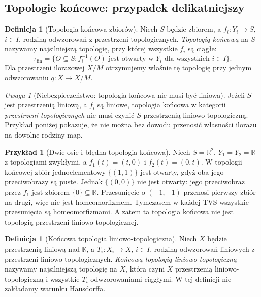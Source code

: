 \documentclass[11pt,a4paper]{article}
\numberwithin{equation}{section}
\theoremstyle{plain}
\theoremstyle{definition}
\newtheorem{definicja}[twierdzenie]{Definicja}
\newtheorem{przyklad}[twierdzenie]{Przykład}
\theoremstyle{remark}
\newtheorem{uwaga}[twierdzenie]{Uwaga}
\newcommand{\R}{\mathbb R}
\newcommand{\K}{\mathbb K}
\begin{document}
\subsection{Topologie końcowe: przypadek delikatniejszy}

\begin{definicja}[Topologia końcowa zbiorów]
Niech $S$ będzie zbiorem, a $f_i:Y_i\to S$, $i\in I$,
rodziną odwzorowań z przestrzeni topologicznych.
\emph{Topologią końcową} na $S$ nazywamy najsilniejszą
topologię, przy której wszystkie $f_i$ są ciągłe:
\[
 \tau_{\mathrm{fin}}=\{O\subseteq S:
    f_i^{-1}(O)\text{ jest otwarty w }Y_i
    \text{ dla wszystkich }i\in I\}.
\]
Dla przestrzeni ilorazowej $X/M$ otrzymujemy właśnie
tę topologię przy jednym odwzorowaniu $q:X\to X/M$.
\end{definicja}

\begin{uwaga}[Niebezpieczeństwo: topologia końcowa nie musi być liniowa]
Jeżeli $S$ jest przestrzenią liniową, a $f_i$ są liniowe,
topologia końcowa w kategorii \emph{przestrzeni topologicznych}
nie musi czynić $S$ przestrzenią liniowo-topologiczną.
Przykład poniżej pokazuje, że nie można bez dowodu
przenosić własności ilorazu na dowolne rodziny map.
\end{uwaga}

\begin{przyklad}[Dwie osie i błędna topologia końcowa]\label{ex:final-cross}
Niech $S=\R^2$, $Y_1=Y_2=\R$ z topologiami zwykłymi,
a $f_1(t)=(t,0)$ i $f_2(t)=(0,t)$. W topologii końcowej
zbiór jednoelementowy $\{(1,1)\}$ jest otwarty,
gdyż oba jego przeciwobrazy są puste. Jednak $\{(0,0)\}$
nie jest otwarty: jego przeciwobraz przez $f_1$ jest
zbiorem $\{0\}\subseteq\R$. Przesunięcie o $(-1,-1)$
przenosi pierwszy zbiór na drugi, więc nie jest
homeomorfizmem. Tymczasem w każdej TVS wszystkie
przesunięcia są homeomorfizmami. A zatem ta topologia
końcowa nie jest topologią przestrzeni liniowo-topologicznej.
\end{przyklad}

\begin{definicja}[Końcowa topologia liniowo-topologiczna]
Niech $X$ będzie przestrzenią liniową nad $\K$, a
$T_i:X_i\to X$, $i\in I$, rodziną odwzorowań
liniowych z przestrzeni liniowo-topologicznych.
\emph{Końcową topologią liniowo-topologiczną}
nazywamy najsilniejszą topologię na $X$, która czyni $X$
przestrzenią liniowo-topologiczną i wszystkie $T_i$
odwzorowaniami ciągłymi. W tej definicji nie zakładamy
warunku Hausdorffa.
\end{definicja}
\end{document}
